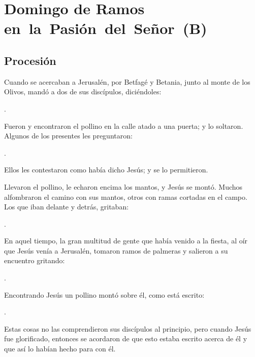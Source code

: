 \chapter{Domingo de Ramos en~la~Pasión~del~Señor~(B)}

\section{Procesión}


 


\begin{scripture}
Cuando se acercaban a Jerusalén, por Betfagé y Betania, junto al monte de los Olivos, mandó a dos de sus discípulos, diciéndoles:

.

Fueron y encontraron el pollino en la calle atado a una puerta; y lo soltaron. Algunos de los presentes les preguntaron:

.

Ellos les contestaron como había dicho Jesús; y se lo permitieron.

Llevaron el pollino, le echaron encima los mantos, y Jesús se montó. Muchos alfombraron el camino con sus mantos, otros con ramas cortadas en el campo. Los que iban delante y detrás, gritaban:

.
\end{scripture}

\newpage
{}

 


\begin{scripture}
En aquel tiempo, la gran multitud de gente que había venido a la fiesta, al oír que Jesús venía a Jerusalén, tomaron ramos de palmeras y salieron a su encuentro gritando:

.

Encontrando Jesús un pollino montó sobre él, como está escrito:

.

Estas cosas no las comprendieron sus discípulos al principio, pero cuando Jesús fue glorificado, entonces se acordaron de que esto estaba escrito acerca de él y que así lo habían hecho para con él.
\end{scripture}

